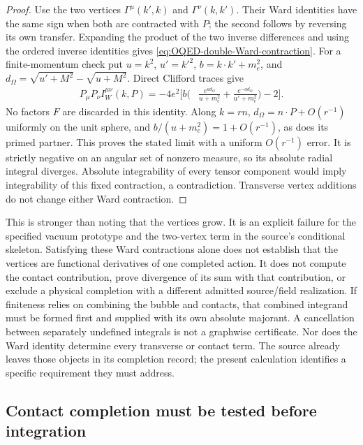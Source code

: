 \documentclass[final,5p,times,twocolumn,numbers,nopreprintline]{elsarticle}
\numberwithin{equation}{section}
\theoremstyle{definition}
\theoremstyle{remark}
\begin{document}
\begin{proof}
Use the two vertices \(\Gamma^\mu(k',k)\) and
\(\Gamma^\nu(k,k')\). Their Ward identities have the same sign when
both are contracted with \(P\); the second follows by reversing its
own transfer. Expanding the product of the two inverse differences
and using the ordered inverse identities gives
\eqref{eq:OQED-double-Ward-contraction}.
For a finite-momentum check put \(u=k^2\), \(u'=k'^2\),
\(b=k\cdot k'+m_e^2\), and
\(d_\Omega=\sqrt{u'+M^2}-\sqrt{u+M^2}\). Direct Clifford traces give
\begin{equation}
\begin{split}
 P_\mu P_\nu I_W^{\mu\nu}(k,P)
 =-4e^2\biggl[ b\biggl(&\frac{e^{a d_\Omega}}{u+m_e^2}
                  +\frac{e^{-a d_\Omega}}{u'+m_e^2}\biggr)-2\biggr].
\end{split}
\label{eq:OQED-double-Ward-finite-trace}
\end{equation}
No factors \(F\) are discarded in this identity. Along \(k=rn\),
\(d_\Omega=n\cdot P+O(r^{-1})\) uniformly on the unit sphere,
and \(b/(u+m_e^2)=1+O(r^{-1})\), as does its primed partner.
This proves the stated limit with a uniform \(O(r^{-1})\) error. It is strictly negative
on an angular set of nonzero measure, so its absolute radial integral
diverges. Absolute integrability of every tensor component would imply
integrability of this fixed contraction, a contradiction. Transverse
vertex additions do not change either Ward contraction.
\end{proof}

This is stronger than noting that the vertices grow. It is an explicit
failure for the specified vacuum prototype and the two-vertex term in
the source's conditional skeleton. Satisfying these Ward contractions
alone does not establish that the vertices are functional derivatives
of one completed action. It does not compute the contact contribution,
prove divergence of its sum with that contribution, or exclude a
physical completion with a different admitted source/field realization.
If finiteness relies on combining the bubble and contacts, that combined
integrand must be formed first and supplied with its own absolute
majorant. A cancellation between separately undefined integrals is not
a graphwise certificate. Nor does the Ward identity determine every
transverse or contact term. The source already leaves those objects
in its completion record; the present calculation identifies a specific
requirement they must address.

\subsection{Contact completion must be tested before integration}
\label{sec:OQED-contact-test}
\end{document}
